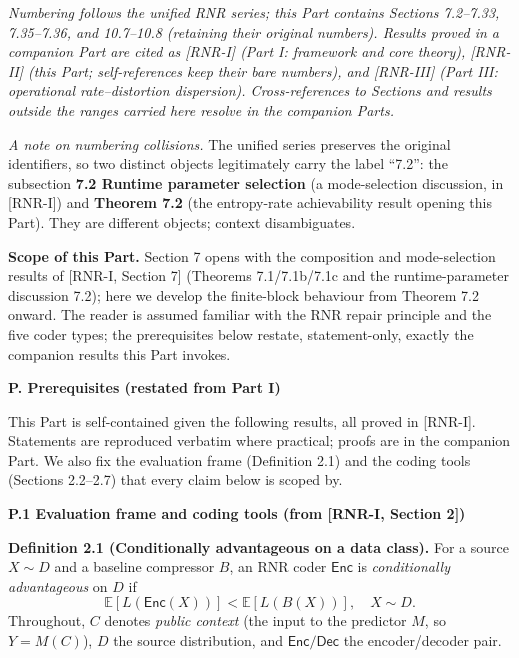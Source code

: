 \documentclass[
]{article}
\begin{document}
\emph{Numbering follows the unified RNR series; this Part contains Sections
7.2--7.33, 7.35--7.36, and 10.7--10.8 (retaining their original numbers).
Results proved in a companion Part are cited as [RNR-I] (Part I:
framework and core theory), [RNR-II] (this Part; self-references keep their
bare numbers), and [RNR-III] (Part III: operational rate--distortion
dispersion). Cross-references to Sections and results outside the ranges
carried here resolve in the companion Parts.}

\emph{A note on numbering collisions.} The unified series preserves the
original identifiers, so two distinct objects legitimately carry the label
``7.2'': the subsection \textbf{7.2 Runtime parameter selection} (a
mode-selection discussion, in [RNR-I]) and \textbf{Theorem 7.2} (the
entropy-rate achievability result opening this Part). They are different
objects; context disambiguates.

\textbf{Scope of this Part.} Section 7 opens with the composition and
mode-selection results of [RNR-I, Section 7] (Theorems 7.1/7.1b/7.1c and
the runtime-parameter discussion 7.2); here we develop the finite-block
behaviour from Theorem 7.2 onward. The reader is assumed familiar with the
RNR repair principle and the five coder types; the prerequisites below
restate, statement-only, exactly the companion results this Part invokes.

\textbf{P. Prerequisites (restated from Part I)}

This Part is self-contained given the following results, all proved in
[RNR-I]. Statements are reproduced verbatim where practical; proofs are in
the companion Part. We also fix the evaluation frame (Definition 2.1) and
the coding tools (Sections 2.2--2.7) that every claim below is scoped by.

\textbf{P.1 Evaluation frame and coding tools (from [RNR-I, Section 2])}

\textbf{Definition 2.1 (Conditionally advantageous on a data class).}
For a source $X \sim D$ and a baseline compressor $B$, an RNR coder
$\mathsf{Enc}$ is \emph{conditionally advantageous} on $D$ if
\[
\mathbb{E}[L(\mathsf{Enc}(X))] < \mathbb{E}[L(B(X))], \quad X \sim D.
\tag{2.1}
\]
Throughout, $C$ denotes \emph{public context} (the input to the predictor
$M$, so $Y = M(C)$), $D$ the source distribution, and
$\mathsf{Enc}/\mathsf{Dec}$ the encoder/decoder pair.
\end{document}
